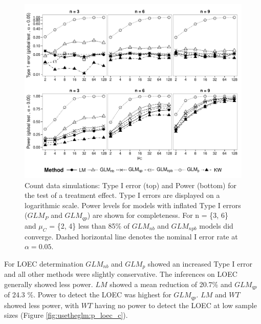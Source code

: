 \begin{figure}
  \centering
  \includegraphics[width = \textwidth]{chapters/usetheglm/p_glob_c.pdf}
  \caption[Count data simulations: Type I error (top) and Power (bottom) for the test of a treatment effect.]{Count data simulations: Type I error (top) and Power (bottom) for the test of a treatment effect.
  Type I errors are displayed on a logarithmic scale.
  Power levels for models with inflated Type I errors ($GLM_P$ and $GLM_{qp}$) are shown for completeness.
  For n = \{3, 6\} and $\mu_C$ = \{2, 4\} less than 85\% of $GLM_{nb}$ and $GLM_{npb}$ models did converge.
  Dashed horizontal line denotes the nominal I error rate at $\alpha = 0.05$.
  }
  \label{fig:usetheglm:p_glob_c}
\end{figure}

For LOEC determination $GLM_{nb}$ and $GLM_{p}$ showed an increased Type I error and all other methods were slightly conservative.
The inferences on LOEC generally showed less power.
$LM$ showed a mean reduction of 20.7\% and $GLM_{qp}$ of 24.3 \%.
Power to detect the LOEC was highest for $GLM_{qp}$. 
$LM$ and $WT$ showed less power, with $WT$ having no power to detect the LOEC at low sample sizes (Figure \ref{fig:usetheglm:p_loec_c}).

